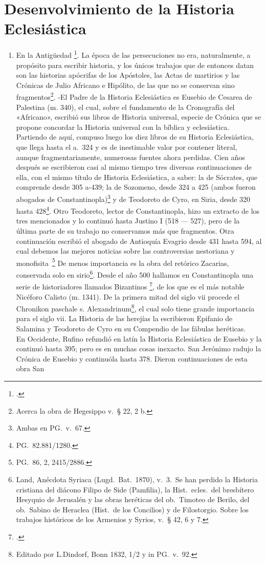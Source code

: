 \raggedbottom{} \documentclass[12pt, a4paper, openany]{book} %
\begin{document}
\section{Desenvolvimiento de la Historia Eclesiástica}
\begin{enumerate}
  \item En la Antigüedad \footcite{Bardenhewer1901Patrologia}. La época de las persecuciones no era, naturalmente, a propósito para escribir historia, y los únicos trabajos que de entonces datan son las historias apócrifas de los Apóstoles, las Actas de martirios y las Crónicas de Julio Africano e Hipólito, de las que no se conservan sino fragmentos\footnote{Acerca la obra de Hegesippo v.\ § 22, 2 b.}. -El Padre de la Historia Eclesiástica es Eusebio de Cesarea de Palestina (m. 340), el cual, sobre el fundamento de la Cronografía del «Africano», escribió sus libros de Historia universal, especie de Crónica que se propone concordar la Historia universal con la bíblica y eclesiástica. Partiendo de aquí, compuso luego los diez libros de su Historia Eclesiástica, que llega hasta el a.\ 324 y es de inestimable valor por contener literal, aunque fragmentariamente, numerosas fuentes ahora perdidas. Cien años después se escribieron casi al mismo tiempo tres diversas continuaciones de ella, con el mismo título de Historia Eclesiástica, a saber: la de Sócrates, que comprende desde 305 a-439; la de Sozomeno, desde 324 a 425 (ambos fueron abogados de Constantinopla)\footnote{Ambas en PG.\ v.\ 67.} y de Teodoreto de Cyro, en Siria, desde 320 hasta 428\footnote{PG.\ 82.881/1280.}. Otro Teodoreto, lector de Constantinopla, hizo un extracto de los tres mencionados y lo continuó hasta Justino I (518 --- 527), pero de la última parte de su trabajo no conservamos más que fragmentos. Otra continuación escribió el abogado de Antioquía Evagrio desde 431 hasta 594, al cual debemos las mejores noticias sobre las controversias nestoriana y monofisita\ \footnote{PG.\ 86, 2, 2415/2886.} De menos importancia es la obra del retórico Zacarias, conservada solo en sirio\textdagger\footnote{Land, Anécdota Syriaca (Lugd.\ Bat.\ 1870), v.\ 3.\ Se han perdido la Historia cristiana del diácono Filipo de Side (Pamfilia), la Hist.\ ecles.\ del bresbítero Hesyquio de Jerusalén y las obras heréticas del ob.\ Timoteo de Berilo, del ob.\ Sabino de Heraclea (Hist.\ de los Concilios) y de Filostorgio. Sobre los trabajos históricos de los Armenios y Syrios, v.\ § 42, 6 y 7.}. Desde el año 500 hallamos en Constantinopla una serie de historiadores llamados Bizantinos \footcite{Niebuhr1829Corpus}, de los que es el más notable Nicéforo Calisto (m. 1341). De la primera mitad del siglo vii procede el Chronikon paschale s. Alexandrinum\footnote{Editado por L.\@ Dindorf, Bonn 1832, 1/2 y in PG.\ v.\ 92.}, el cual solo tiene grande importancia para el siglo vii. La Historia de las herejías la escribieron Epifanio de Salamina y Teodoreto de Cyro en su Compendio de las fábulas heréticas.\\ En Occidente, Rufino refundió en latín la Historia Eclesiástica de Eusebio y la continuó hasta 395; pero es en muchas cosas inexacto. San Jerónimo radujo la Crónica de Eusebio y continuóla hasta 378. Dieron continuaciones de esta obra San 
\end{enumerate}
\end{document}
